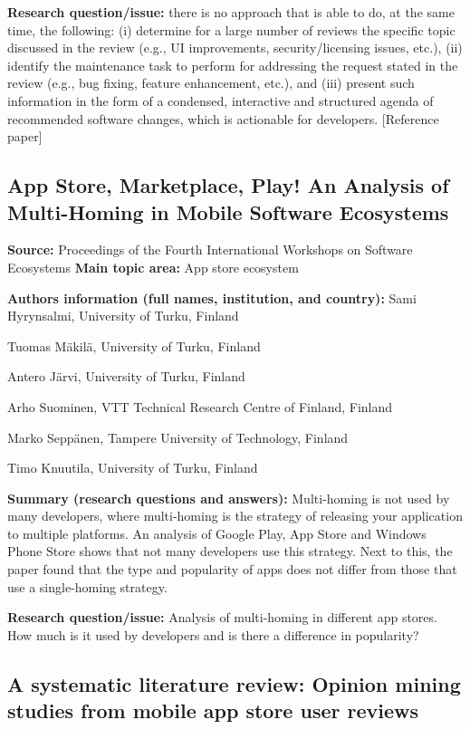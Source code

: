 \documentclass[]{book}
\begin{document}
\textbf{Research question/issue:} there is no approach that is able to
do, at the same time, the following: (i) determine for a large number of
reviews the speciﬁc topic discussed in the review (e.g., UI
improvements, security/licensing issues, etc.), (ii) identify the
maintenance task to perform for addressing the request stated in the
review (e.g., bug ﬁxing, feature enhancement, etc.), and (iii) present
such information in the form of a condensed, interactive and structured
agenda of recommended software changes, which is actionable for
developers. {[}Reference paper{]}

\subsection{App Store, Marketplace, Play! An Analysis of Multi-Homing in
Mobile Software
Ecosystems}\label{app-store-marketplace-play-an-analysis-of-multi-homing-in-mobile-software-ecosystems}

\textbf{Source:} Proceedings of the Fourth International Workshops on
Software Ecosystems \textbf{Main topic area:} App store ecosystem

\textbf{Authors information (full names, institution, and country):}
Sami Hyrynsalmi, University of Turku, Finland

Tuomas Mäkilä, University of Turku, Finland

Antero Järvi, University of Turku, Finland

Arho Suominen, VTT Technical Research Centre of Finland, Finland

Marko Seppänen, Tampere University of Technology, Finland

Timo Knuutila, University of Turku, Finland

\textbf{Summary (research questions and answers):} Multi-homing is not
used by many developers, where multi-homing is the strategy of releasing
your application to multiple platforms. An analysis of Google Play, App
Store and Windows Phone Store shows that not many developers use this
strategy. Next to this, the paper found that the type and popularity of
apps does not differ from those that use a single-homing strategy.

\textbf{Research question/issue:} Analysis of multi-homing in different
app stores. How much is it used by developers and is there a difference
in popularity?

\subsection{A systematic literature review: Opinion mining studies from
mobile app store user
reviews}\label{a-systematic-literature-review-opinion-mining-studies-from-mobile-app-store-user-reviews}
\end{document}
